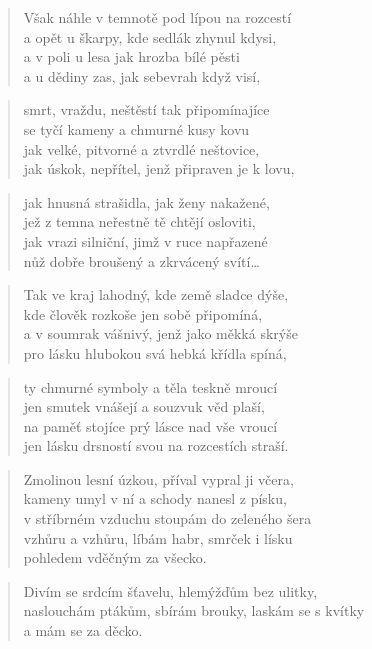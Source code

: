 \documentclass{book}
\begin{document}
\begin{verse}
Však náhle v temnotě pod lípou na rozcestí\\
a opět u škarpy, kde sedlák zhynul kdysi,\\
a v poli u lesa jak hrozba bílé pěsti\\
a u dědiny zas, jak sebevrah když visí,
\end{verse}
\begin{verse}
smrt, vraždu, neštěstí tak připomínajíce\\
se tyčí kameny a chmurné kusy kovu\\
jak velké, pitvorné a ztvrdlé neštovice,\\
jak úskok, nepřítel, jenž připraven je k lovu,
\end{verse}
\begin{verse}
jak hnusná strašidla, jak ženy nakažené,\\
jež z temna neřestně tě chtějí osloviti,\\
jak vrazi silniční, jimž v ruce napřazené\\
nůž dobře broušený a zkrvácený svítí\ldots
\end{verse}
\begin{verse}
Tak ve kraj lahodný, kde země sladce dýše,\\
kde člověk rozkoše jen sobě připomíná,\\
a v soumrak vášnivý, jenž jako měkká skrýše\\
pro lásku hlubokou svá hebká křídla spíná,
\end{verse}
\begin{verse}
ty chmurné symboly a těla teskně mroucí\\
jen smutek vnášejí a souzvuk věd plaší,\\
na paměť stojíce prý lásce nad vše vroucí\\
jen lásku drsností svou na rozcestích straší.
\end{verse}
\newpage
{}
\begin{verse}
Zmolinou lesní úzkou, příval vypral ji včera,\\
kameny umyl v ní a schody nanesl z písku,\\
v stříbrném vzduchu stoupám do zeleného šera\\
vzhůru a vzhůru, líbám habr, smrček i lísku\\
pohledem vděčným za všecko.
\end{verse}
\begin{verse}
Divím se srdcím šťavelu, hlemýžďům bez ulitky,\\
naslouchám ptákům, sbírám brouky, laskám se s kvítky\\
a mám se za děcko.
\end{verse}
\end{document}
